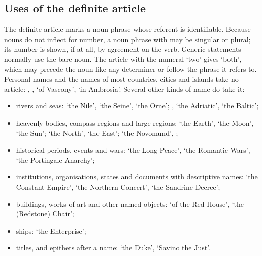 \subsection{Uses of the definite article}
The definite article marks a noun phrase whose referent is identifiable. Because nouns do not inflect for number, a noun phrase with  may be singular or plural; its number is shown, if at all, by agreement on the verb.
Generic statements normally use the bare noun. The article with the numeral  `two' gives  `both', which may precede the noun like any determiner or follow the phrase it refers to.
Personal names and the names of most countries, cities and islands take no article: , ,  `of Vascony',  `in Ambrosia'. Several other kinds of name do take it:
\begin{itemize}
    \item rivers and seas:  `the Nile',  `the Seine',  `the Orne'; ,  `the Adriatic',  `the Baltic';
    \item heavenly bodies, compass regions and large regions:  `the Earth',  `the Moon',  `the Sun';  `the North',  `the East';  `the Novomund', ;
    \item historical periods, events and wars:  `the Long Peace',  `the Romantic Wars',  `the Portingale Anarchy';
    \item institutions, organisations, states and documents with descriptive names:  `the Constant Empire',  `the Northern Concert',  `the Sandrine Decree';
    \item buildings, works of art and other named objects:  `of the Red House',  `the (Redstone) Chair';
    \item ships:  `the Enterprise';
    \item titles, and epithets after a name:  `the Duke',  `Savino the Just'.
\end{itemize}
